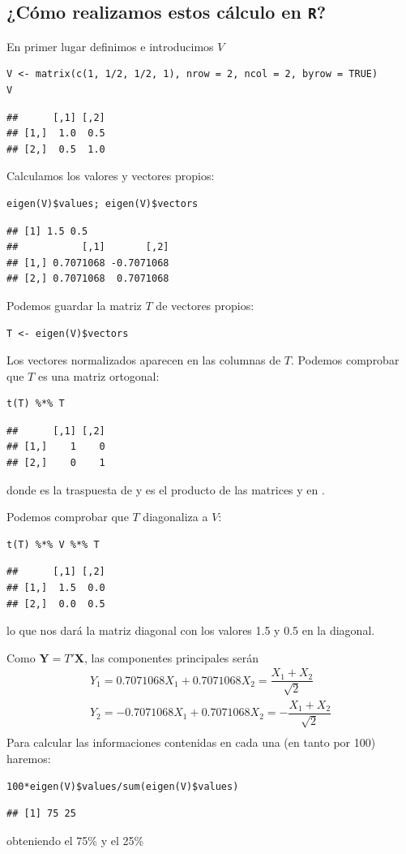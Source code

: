 \subsection{¿Cómo realizamos estos cálculo en \textbf{\texttt{R}}?}
En primer lugar definimos e introducimos $V$
\begin{lstlisting}
V <- matrix(c(1, 1/2, 1/2, 1), nrow = 2, ncol = 2, byrow = TRUE)
V
\end{lstlisting}
\begin{verbatim}
##      [,1] [,2]
## [1,]  1.0  0.5
## [2,]  0.5  1.0
\end{verbatim}
Calculamos los valores y vectores propios:
\begin{lstlisting}
eigen(V)$values; eigen(V)$vectors
\end{lstlisting}
\begin{verbatim}
## [1] 1.5 0.5
##           [,1]       [,2]
## [1,] 0.7071068 -0.7071068
## [2,] 0.7071068  0.7071068
\end{verbatim}
Podemos guardar la matriz $T$ de vectores propios:
\begin{lstlisting}
T <- eigen(V)$vectors
\end{lstlisting}
Los vectores normalizados aparecen en las columnas de $T$. Podemos comprobar que $T$ es una matriz ortogonal:
\begin{lstlisting}
t(T) %*% T
\end{lstlisting}
\begin{verbatim}
##      [,1] [,2]
## [1,]    1    0
## [2,]    0    1
\end{verbatim}
donde  es la traspuesta de  y  es el producto de las matrices  y  en .

Podemos comprobar que $T$ diagonaliza a $V$:
\begin{lstlisting}
t(T) %*% V %*% T
\end{lstlisting}
\begin{verbatim}
##      [,1] [,2]
## [1,]  1.5  0.0
## [2,]  0.0  0.5
\end{verbatim}
lo que nos dará la matriz diagonal con los valores 1.5 y 0.5 en la diagonal.

Como $\mathbf{Y}=T'\mathbf{X}$, las componentes principales serán \[ \begin{array}{l}
	Y_1=0.7071068X_1+0.7071068X_2=\dfrac{X_1+X_2}{\sqrt{2}}\\
	Y_2=-0.7071068X_1+0.7071068X_2=-\dfrac{X_1+X_2}{\sqrt{2}}\\
\end{array} \]
Para calcular las informaciones contenidas en cada una (en tanto por 100) haremos:
\begin{lstlisting}
100*eigen(V)$values/sum(eigen(V)$values)
\end{lstlisting}
\begin{verbatim}
## [1] 75 25
\end{verbatim}
obteniendo el 75\% y el 25\%
